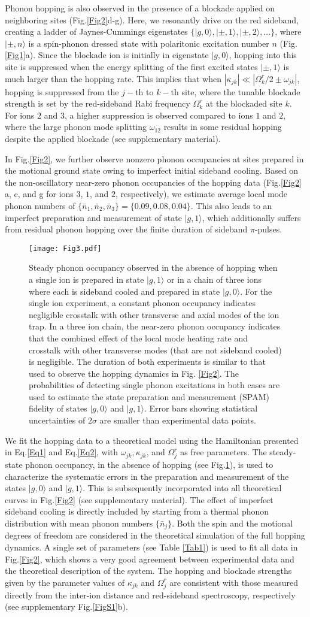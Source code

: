 \documentclass[groupaddress,9pt,twocolumn,superscriptaddress, aps, prl]{revtex4-1}
\newcommand{\ket}[1]{|#1\rangle}
\newcommand{\FigureThree}{
\begin{figure}
\begin{center}
\texttt{[image: Fig3.pdf]}
\end{center}
\renewcommand{\baselinestretch}{1}
\small\normalsize
\caption{Steady phonon occupancy observed in the absence of hopping when a single ion is prepared in state $\ket{g,1}$ or in a chain of three ions where each is sideband cooled and prepared in state $\ket{g,0}$. For the single ion experiment, a constant phonon occupancy indicates negligible crosstalk with other transverse and axial modes of the ion trap. In a three ion chain, the near-zero phonon occupancy indicates that the combined effect of the local mode heating rate and crosstalk with other transverse modes (that are not sideband cooled) is negligible. The duration of both experiments is similar to that used to observe the hopping dynamics in Fig. \ref{Fig2}. The probabilities of detecting single phonon excitations in both cases are used to estimate the state preparation and measurement (SPAM) fidelity of states $\ket{g,0}$ and $\ket{g,1}$. Error bars showing statistical uncertainties of $2\sigma$ are smaller than experimental data points.
}
\label{Fig3}
\end{figure}}
\begin{document}
Phonon hopping is also observed in the presence of a blockade applied on neighboring sites (Fig.\ref{Fig2}d-g). Here, we resonantly drive on the red sideband, creating a ladder of Jaynes-Cummings eigenstates $\{\ket{g,0},\ket{\pm,1},\ket{\pm,2}, ...\}$, where $\ket{\pm,n}$ is a spin-phonon dressed state with polaritonic excitation number $n$ (Fig.\ref{Fig1}a). Since the blockade ion is initially in eigenstate $\ket{g,0}$, hopping into this site is suppressed when the energy splitting of the first excited states $\ket{\pm, 1}$ is much larger than the hopping rate. This implies that when $|\kappa_{jk}|\ll |\Omega_k^r/2\pm\omega_{jk}|$, hopping is suppressed from the $j-$th to $k-$th site, where the tunable blockade strength is set by the red-sideband Rabi frequency $\Omega_k^r$ at the blockaded site $k$. For ions $2$ and $3$, a higher suppression is observed compared to ions $1$ and $2$, where the large phonon mode splitting $\omega_{12}$ results in some residual hopping despite the applied blockade (see supplementary material). 

In Fig.\ref{Fig2}, we further observe nonzero phonon occupancies at sites prepared in the motional ground state owing to imperfect initial sideband cooling. Based on the non-oscillatory near-zero phonon occupancies of the hopping data (Fig.\ref{Fig2} a, c, and g for ions $3$, $1$, and $2$, respectively), we estimate average local mode phonon numbers of $\{\bar{n}_1,\bar{n}_2,\bar{n}_3\}=\{0.09,0.08,0.04\}$. This also leads to an imperfect preparation and measurement of state $\ket{g,1}$, which additionally suffers from residual phonon hopping over the finite duration of sideband $\pi$-pulses.
\FigureThree

We fit the hopping data to a theoretical model using the Hamiltonian presented in Eq.\ref{Eq1} and Eq.\ref{Eq2}, with $\omega_{jk}, \kappa_{jk} $, and $\Omega_{j}^{r}$ as free parameters. The steady-state phonon occupancy, in the absence of hopping (see Fig.\ref{Fig3}), is used to characterize the systematic errors in the preparation and measurement of the states $\ket{g,0}$ and $\ket{g,1}$.  This is subsequently incorporated into all theoretical curves in Fig.\ref{Fig2} \cite{Shen2012} (see supplementary material). The effect of imperfect sideband cooling is directly included by starting from a thermal phonon distribution with mean phonon numbers $\{\bar{n}_j\}$. Both the spin and the motional degrees of freedom are considered in the theoretical simulation of the full hopping dynamics. A single set of parameters (see Table \ref{Tab1}) is used to fit all data in Fig.\ref{Fig2}, which shows a very good agreement between experimental data and the theoretical description of the system. The hopping and blockade strengths given by the parameter values of $\kappa_{jk}$ and $\Omega_j^r$ are consistent with those measured directly from the inter-ion distance and red-sideband spectroscopy, respectively (see supplementary Fig.\ref{FigS1}b).
\end{document}
